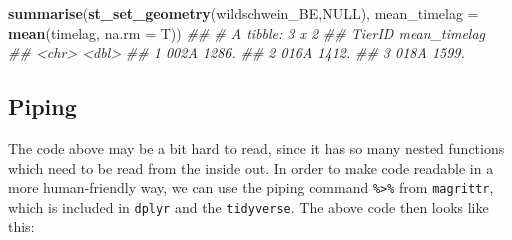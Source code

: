 \documentclass[]{book}
\newenvironment{Shaded}{\begin{snugshade}}{\end{snugshade}}
\newcommand{\CommentTok}[1]{\textcolor[rgb]{0.56,0.35,0.01}{\textit{#1}}}
\newcommand{\DataTypeTok}[1]{\textcolor[rgb]{0.13,0.29,0.53}{#1}}
\newcommand{\KeywordTok}[1]{\textcolor[rgb]{0.13,0.29,0.53}{\textbf{#1}}}
\newcommand{\NormalTok}[1]{#1}
\newcommand{\OperatorTok}[1]{\textcolor[rgb]{0.81,0.36,0.00}{\textbf{#1}}}
\newcommand{\OtherTok}[1]{\textcolor[rgb]{0.56,0.35,0.01}{#1}}
\newcommand{\StringTok}[1]{\textcolor[rgb]{0.31,0.60,0.02}{#1}}
\begin{document}
\begin{Shaded}
\begin{Highlighting}[]

\KeywordTok{summarise}\NormalTok{(}\KeywordTok{st_set_geometry}\NormalTok{(wildschwein_BE,}\OtherTok{NULL}\NormalTok{), }\DataTypeTok{mean_timelag =} \KeywordTok{mean}\NormalTok{(timelag, }\DataTypeTok{na.rm =}\NormalTok{ T))}
\CommentTok{## # A tibble: 3 x 2}
\CommentTok{##   TierID mean_timelag}
\CommentTok{##   <chr>         <dbl>}
\CommentTok{## 1 002A          1286.}
\CommentTok{## 2 016A          1412.}
\CommentTok{## 3 018A          1599.}
\end{Highlighting}
\end{Shaded}

\hypertarget{piping}{%
\subsection{Piping}\label{piping}}

The code above may be a bit hard to read, since it has so many nested functions which need to be read from the inside out. In order to make code readable in a more human-friendly way, we can use the piping command \texttt{\%\textgreater{}\%} from \texttt{magrittr}, which is included in \texttt{dplyr} and the \texttt{tidyverse}. The above code then looks like this:

\begin{Shaded}
\end{Shaded}
\end{document}

